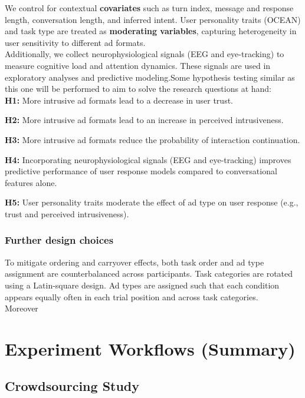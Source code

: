 \documentclass{article}
\begin{document}
We control for contextual \textbf{covariates} such as turn index, message and response length, conversation length, and inferred intent. User personality traits (OCEAN) and task type are treated as \textbf{moderating variables}, capturing heterogeneity in user sensitivity to different ad formats.
\\

Additionally, we collect neurophysiological signals (EEG and eye-tracking) to measure cognitive load and attention dynamics. These signals are used in exploratory analyses and predictive modeling.Some hypothesis testing similar as this one will be performed to aim to solve the research questions at hand:
\\

\textbf{H1:} More intrusive ad formats lead to a decrease in user trust.

\textbf{H2:} More intrusive ad formats lead to an increase in perceived intrusiveness.

\textbf{H3:} More intrusive ad formats reduce the probability of interaction continuation.

\textbf{H4:} Incorporating neurophysiological signals (EEG and eye-tracking) improves predictive performance of user response models compared to conversational features alone.

\textbf{H5:} User personality traits moderate the effect of ad type on user response (e.g., trust and perceived intrusiveness).

\subsubsection{Further design choices}

To mitigate ordering and carryover effects, both task order and ad type assignment are counterbalanced across participants. Task categories are rotated using a Latin-square design. Ad types are assigned such that each condition appears equally often in each trial position and across task categories.
\\

Moreover

\newpage

\section{Experiment Workflows (Summary)}

\subsection{Crowdsourcing Study}
\end{document}
